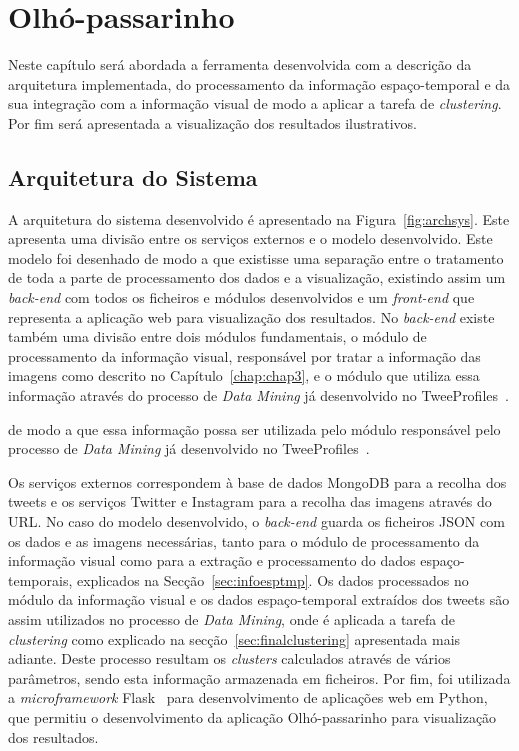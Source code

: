 \chapter{Olhó-passarinho}\label{chap:chap4}

Neste capítulo será abordada a ferramenta desenvolvida com a descrição da arquitetura implementada, do processamento da informação espaço-temporal e da sua integração com a informação visual de modo a aplicar a tarefa de \textit{clustering}. Por fim será apresentada a visualização dos resultados ilustrativos.

\section{Arquitetura do Sistema}

A arquitetura do sistema desenvolvido é apresentado na Figura~\ref{fig:archsys}. Este apresenta uma divisão entre os serviços externos e o modelo desenvolvido. Este modelo foi desenhado de modo a que existisse uma separação entre o tratamento de toda a parte de processamento dos dados e a visualização, existindo assim um \textit{back-end} com todos os ficheiros e módulos desenvolvidos e um \textit{front-end} que representa a aplicação web para visualização dos resultados. No \textit{back-end} existe também uma divisão entre dois módulos fundamentais, o módulo de processamento da informação visual, responsável por tratar a informação das imagens como descrito no Capítulo~\ref{chap:chap3}, e o módulo que utiliza essa informação através do processo de \textit{Data Mining} já desenvolvido no TweeProfiles~\cite{Cunha2013}.

de modo a que essa informação possa ser utilizada pelo módulo responsável pelo processo de \textit{Data Mining} já desenvolvido no TweeProfiles~\cite{Cunha2013}. 

Os serviços externos correspondem à base de dados MongoDB para a recolha dos tweets e os serviços Twitter e Instagram para a recolha das imagens através do URL. No caso do modelo desenvolvido, o \textit{back-end} guarda os ficheiros JSON com os dados e as imagens necessárias, tanto para o módulo de processamento da informação visual como para a extração e processamento do dados espaço-temporais, explicados na Secção~\ref{sec:infoesptmp}. Os dados processados no módulo da informação visual e os dados espaço-temporal extraídos dos tweets são assim utilizados no processo de \textit{Data Mining}, onde é aplicada a tarefa de \textit{clustering} como explicado na secção~\ref{sec:finalclustering} apresentada mais adiante. Deste processo resultam os \textit{clusters} calculados através de vários parâmetros, sendo esta informação armazenada em ficheiros. Por fim, foi utilizada a \textit{microframework} Flask~\cite{flask} para desenvolvimento de aplicações web em Python, que permitiu o desenvolvimento da aplicação Olhó-passarinho para visualização dos resultados. 

